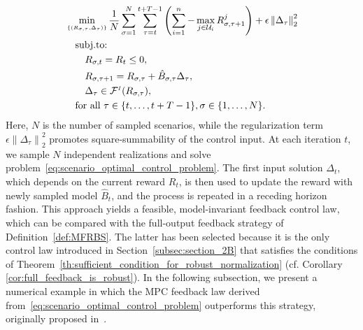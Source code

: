 \documentclass[10pt,leqno]{amsart}
\newcommand{\sml}{\scriptscriptstyle}
\newcommand{\norm}[1]{\left \|#1 \right \|}
\newcommand{\U}{\mathcal{U}}
\newcommand{\Cost}{R}
\newcommand{\invset}[1]{\mathcal{F}^{\sml I}(#1)}
\newcommand{\twonorm}[1]{\norm{#1}_2}
\newcommand{\Bapx}{\hat{B}}
\begin{document}
\begin{subequations}\label{eq:scenario_optimal_control_problem}
    \begin{align}
        &\min_{\sml \{(\Cost_{\sigma,\tau}, \Delta_\tau)\}} \frac{1}{N} \sum_{\sigma = 1}^N \sum_{\tau = t}^{t+T-1} \left(\sum_{i = 1}^n -\max_{j \in \U_i} \Cost_{\sigma, \tau+1}^j\right) + \epsilon \twonorm{\Delta_\tau}^2\\\notag
        &\quad\text{subj.to:}\\
        &\qquad \Cost_{\sigma, t} = \Cost_t \leq 0,\\
        &\qquad \Cost_{\sigma, \tau+1} = \Cost_{\sigma,\tau} + \Bapx_{\sigma,\tau} \Delta_\tau,\\
        &\qquad \Delta_\tau \in \invset{\Cost_{\sigma,\tau}},\\
        &\quad\text{for all } \tau \in \{t, \hdots,t+T-1\}, \sigma \in \{1, \hdots, N\}.\notag
    \end{align}
\end{subequations}
Here, $N$ is the number of sampled scenarios, while the regularization term $\epsilon \twonorm{\Delta_\tau}^2$ promotes square-summability of the control input. At each iteration $t$, we sample $N$ independent realizations and solve problem~\eqref{eq:scenario_optimal_control_problem}. The first input solution $\Delta_t$, which depends on the current reward $\Cost_t$, is then used to update the reward with newly sampled model $\Bapx_t$, and the process is repeated in a receding horizon fashion. This approach yields a feasible, model-invariant feedback control law, which can be compared with the full-output feedback strategy of Definition~\ref{def:MFRBS}. The latter has been selected because it is the only control law introduced in Section~\ref{subsec:section_2B} that satisfies the conditions of Theorem~\ref{th:sufficient_condition_for_robust_normalization} (cf. Corollary \ref{cor:full_feedback_is_robust}). In the following subsection, we present a numerical example in which the MPC feedback law derived from~\eqref{eq:scenario_optimal_control_problem} outperforms this strategy, originally proposed in~\cite{mustafin2025mdpgeometrynormalizationreward}. 
\end{document}
